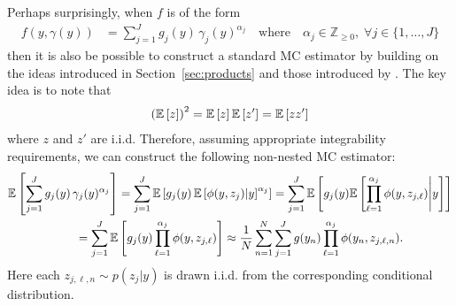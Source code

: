 Perhaps surprisingly, when $f$ is of the form
\begin{align}
  f(y,\gamma(y)) &= \sum_{j=1}^{J} g_j(y) \, \gamma_j(y)^{\alpha_j} \quad \text{where}
  \quad \alpha_j \in \mathbb{Z}_{\geq 0}, \; \forall j \in \{1,\dots,J\}
\end{align}
then it is also be possible to construct a standard MC estimator by building on the ideas
introduced in Section~\ref{sec:products} and those introduced by \cite{goda2016computing}.
The key idea is to note that
\begin{align*}
\left(\mathbb{E} \left[z\right]\right)^2 = \mathbb{E} \left[z\right]\mathbb{E} \left[z'\right] = \mathbb{E} \left[z z'\right]
\end{align*}
where $z$ and $z'$ are i.i.d.  Therefore, assuming appropriate integrability requirements,
we can construct the following non-nested MC estimator:
\begin{align}
\mathbb{E}\left[\sum_{j=1}^{J} g_j(y) \, \gamma_j(y)^{\alpha_j}\right] &= 
\sum_{j=1}^{J} \mathbb{E}\left[g_j(y) \, \mathbb{E}\left[\phi(y,z_{j}) | y\right]^{\alpha_j}\right]
=\sum_{j=1}^{J} \mathbb{E}\left[g_j(y) \mathbb{E}\left[\prod_{\ell=1}^{\alpha_j} \phi(y,z_{j,\ell}) \middle|y\right]\right] \nonumber \\
=\sum_{j=1}^{J} \mathbb{E}&\left[g_j(y)\prod_{\ell=1}^{\alpha_j} \phi(y,z_{j,\ell})\right]
\approx \frac{1}{N} \sum_{n=1}^{N} \sum_{j=1}^{J} g(y_n)\prod_{\ell=1}^{\alpha_j} \phi(y_n,z_{j,\ell,n}).
\end{align}
Here each $z_{j,\ell,n} \sim p(z_j | y)$ is drawn i.i.d. from the corresponding conditional distribution.
